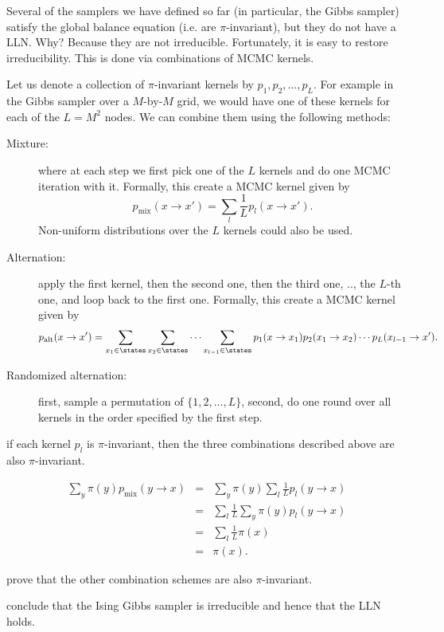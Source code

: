 \documentclass{article}
\begin{document}
Several of the samplers we have defined so far (in particular, the Gibbs sampler) satisfy the global balance equation (i.e. are $\pi$-invariant), but they do not have a LLN. Why? Because they are not irreducible. Fortunately, it is easy to restore irreducibility. This is done via combinations of MCMC kernels.

 Let us denote a collection of $\pi$-invariant kernels by $p_1, p_2, \dots, p_L$. For example in the Gibbs sampler over a $M$-by-$M$ grid, we would have one of these kernels for each of the $L = M^2$ nodes. We can combine them using the following methods:
\begin{description}
  \item[Mixture:] where at each step we first pick one of the $L$ kernels and do one MCMC iteration with it. Formally, this create a MCMC kernel given by \[ p_\text{mix}(x\to x') = \sum_l \frac{1}{L} p_l(x \to x'). \]Non-uniform distributions over the $L$ kernels could also be used.
  \item[Alternation:] apply the first kernel, then the second one, then the third one, .., the $L$-th one, and loop back to the first one. Formally, this create a MCMC kernel given by \[ p_\textrm{alt}(x \to x') = \sum_{x_1\in\states} \sum_{x_2\in\states} \cdots \sum_{x_{l-1}\in\states} p_1(x \to x_1) p_2(x_1 \to x_2) \cdots p_L(x_{l-1} \to x'). \]
  \item[Randomized alternation:] first, sample a permutation of $\{1, 2, \dots, L\}$, second, do one round over all kernels in the order specified by the first step.
\end{description} 

 if each kernel $p_l$ is $\pi$-invariant, then the three combinations described above are also $\pi$-invariant.  

\begin{eqnarray}
\sum_y \pi(y) p_\textrm{mix}(y \to x) &=& \sum_y \pi(y) \sum_l \frac{1}{L} p_l(y \to x) \\
&=& \sum_l \frac{1}{L} \sum_y \pi(y) p_l(y \to x) \\
&=& \sum_l \frac{1}{L} \pi(x) \\
&=& \pi(x).
\end{eqnarray}

 prove that the other combination schemes are also $\pi$-invariant. 

 conclude that the Ising Gibbs sampler is irreducible and hence that the LLN holds. 




\end{document}
